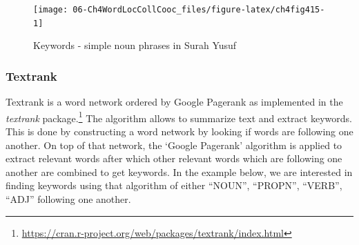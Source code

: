 \documentclass[
]{article}
\newenvironment{Shaded}{\begin{snugshade}}{\end{snugshade}}
\newcommand{\AttributeTok}[1]{\textcolor[rgb]{0.13,0.29,0.53}{#1}}
\newcommand{\ConstantTok}[1]{\textcolor[rgb]{0.56,0.35,0.01}{#1}}
\newcommand{\DecValTok}[1]{\textcolor[rgb]{0.00,0.00,0.81}{#1}}
\newcommand{\FunctionTok}[1]{\textcolor[rgb]{0.13,0.29,0.53}{\textbf{#1}}}
\newcommand{\NormalTok}[1]{#1}
\newcommand{\OtherTok}[1]{\textcolor[rgb]{0.56,0.35,0.01}{#1}}
\newcommand{\SpecialCharTok}[1]{\textcolor[rgb]{0.81,0.36,0.00}{\textbf{#1}}}
\newcommand{\StringTok}[1]{\textcolor[rgb]{0.31,0.60,0.02}{#1}}
\begin{document}
\begin{Shaded}
\end{Shaded}

\begin{figure}

{\centering \texttt{[image: 06-Ch4WordLocCollCooc\_files/figure-latex/ch4fig415-1]} 

}

\caption{Keywords - simple noun phrases in Surah Yusuf}\label{fig:ch4fig415}
\end{figure}

\hypertarget{textrank}{%
\subsubsection{Textrank}\label{textrank}}

Textrank is a word network ordered by Google Pagerank as implemented in the \emph{textrank} \citep{textrank} package.\footnote{\url{https://cran.r-project.org/web/packages/textrank/index.html}} The algorithm allows to summarize text and extract keywords. This is done by constructing a word network by looking if words are following one another. On top of that network, the `Google Pagerank' algorithm is applied to extract relevant words after which other relevant words which are following one another are combined to get keywords. In the example below, we are interested in finding keywords using that algorithm of either ``NOUN'', ``PROPN'', ``VERB'', ``ADJ'' following one another.
\end{document}

